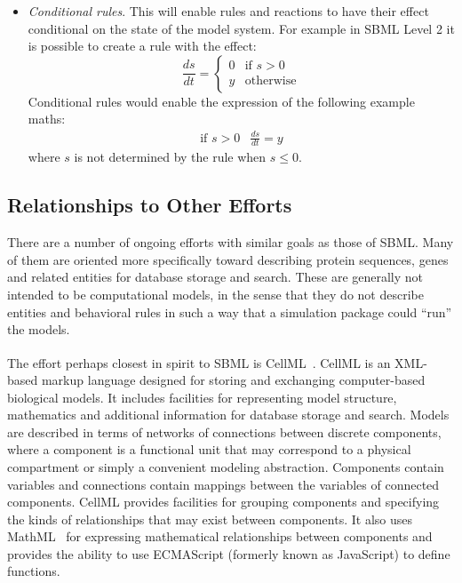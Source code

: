 \documentclass[10pt]{cekarticle}
\newcommand{\tm}{\textsuperscript{\tiny{\texttrademark}}}
\begin{document}
\begin{itemize}
\item \emph{Conditional rules}.  This will enable rules and reactions to have
their effect conditional on the state of the model system.  For example in
SBML Level 2 it is possible to create a rule with the effect:
\begin{equation*}
\frac{d s}{d t} =
\left\{
\begin{array}{ll}
     0 & \mbox{if $s>0$}\\
     y & \mbox{otherwise}
\end{array}
\right.
\end{equation*}
Conditional rules would enable the expression of the following example maths:
\begin{equation*}
\begin{array}{ll}
\mbox{if $s>0$} & \frac{d s}{d t} = y 
\end{array}
\end{equation*}
where $s$ is not determined by the rule when $s \leq 0$.
\end{itemize}
\subsection{Relationships to Other Efforts}
\label{sec:other-efforts}


There are a number of ongoing efforts with similar goals as those of SBML.
Many of them are oriented more specifically toward describing protein
sequences, genes and related entities for database storage and search.
These are generally not intended to be computational models, in the sense
that they do not describe entities and behavioral rules in such a way that
a simulation package could ``run'' the models.

The effort perhaps closest in spirit to SBML is
CellML\tm~\citep{hedley:2001b}.  CellML is an XML-based markup language
designed for storing and exchanging computer-based biological models. It
includes facilities for representing model structure, mathematics and
additional information for database storage and search.  Models are
described in terms of networks of connections between discrete components,
where a component is a functional unit that may correspond to a physical
compartment or simply a convenient modeling abstraction.  Components
contain variables and connections contain mappings between the variables of
connected components.  CellML provides facilities for grouping components
and specifying the kinds of relationships that may exist between
components.  It also uses MathML~\citep{w3c:2000b} for expressing mathematical
relationships between components and provides the ability to use ECMAScript
(formerly known as JavaScript) to define functions.
\end{document}
